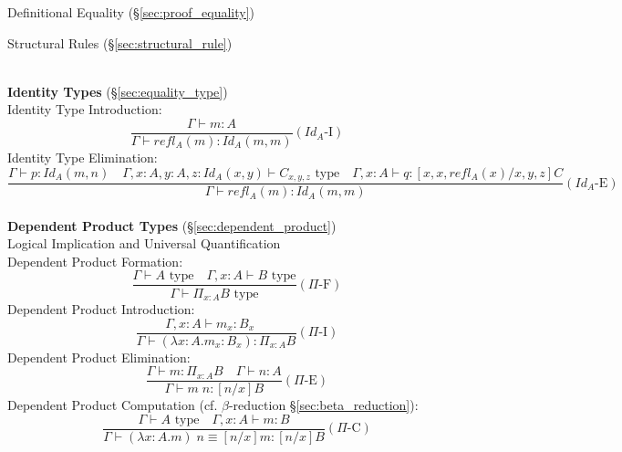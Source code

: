 Definitional Equality (\S\ref{sec:proof_equality})

Structural Rules (\S\ref{sec:structural_rule})



\hfill \\
\textbf{Identity Types} (\S\ref{sec:equality_type})
\\
Identity Type Introduction:
\[
  \frac{
    \Gamma \vdash m : A
  }{
    \Gamma \vdash refl_A(m) : Id_A(m,m)
  } (Id_A\text{-I})
\]
Identity Type Elimination:
\[
  \frac{
    \Gamma \vdash p : Id_A (m,n) \quad
    \Gamma, x:A, y:A, z : Id_A(x,y) \vdash C_{x,y,z} \text{ type}\quad
    \Gamma, x : A \vdash q : [x, x, refl_A(x)/x,y,z]C
  }{
    \Gamma \vdash refl_A(m) : Id_A(m,m)
  } (Id_A\text{-E})
\]
\hfill \\
\textbf{Dependent Product Types} (\S\ref{sec:dependent_product})
\\
Logical Implication and Universal Quantification
\\
Dependent Product Formation:
\[
  \frac{
    \Gamma \vdash A \text{ type} \quad
    \Gamma, x:A \vdash B \text{ type}
  }{
    \Gamma \vdash \Pi_{x:A} B \text{ type}
  } (\Pi\text{-F})
\]
Dependent Product Introduction:
\[
  \frac{
    \Gamma, x : A \vdash m_x : B_x \quad
  }{
    \Gamma \vdash (\lambda x:A.m_x : B_x) : \Pi_{x:A} B
  } (\Pi\text{-I})
\]
Dependent Product Elimination:
\[
  \frac{
    \Gamma \vdash m : \Pi_{x:A} B \quad
    \Gamma \vdash n : A
  }{
    \Gamma \vdash m\;n : [n/x]B
  } (\Pi\text{-E})
\]
Dependent Product Computation (cf. $\beta$-reduction
\S\ref{sec:beta_reduction}):
\[
  \frac{
    \Gamma \vdash A \text{ type} \quad
    \Gamma , x : A \vdash m : B
  }{
    \Gamma \vdash (\lambda x : A.m)\;n \equiv [n/x]m : [n/x]B
  } (\Pi\text{-C})
\]



